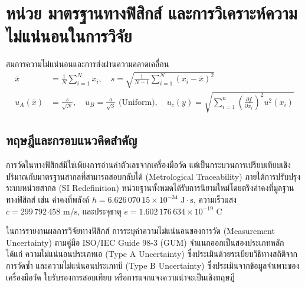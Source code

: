 
\chapter{หน่วย มาตรฐานทางฟิสิกส์ และการวิเคราะห์ความไม่แน่นอนในการวิจัย}
\label{ch:chapter01}


\vspace{0.4cm}

\begin{equationsbox}{สมการความไม่แน่นอนและการส่งผ่านความคลาดเคลื่อน}
\begin{align}
\bar{x} &= \frac{1}{N}\sum_{i=1}^{N} x_i, \quad s = \sqrt{\frac{1}{N-1}\sum_{i=1}^{N}(x_i - \bar{x})^2} \\
u_A(\bar{x}) &= \frac{s}{\sqrt{N}}, \quad u_B = \frac{a}{\sqrt{3}} \text{ (Uniform)}, \quad u_c(y) = \sqrt{\sum_{i=1}^{n}\left(\frac{\partial f}{\partial x_i}\right)^2 u^2(x_i)}
\end{align}
\end{equationsbox}

\section{ทฤษฎีและกรอบแนวคิดสำคัญ}

การวัดในทางฟิสิกส์มิใช่เพียงการอ่านค่าตัวเลขจากเครื่องมือวัด แต่เป็นกระบวนการเปรียบเทียบเชิงปริมาณกับมาตรฐานสากลที่สามารถสอบกลับได้ (Metrological Traceability) ภายใต้การปรับปรุงระบบหน่วยสากล (SI Redefinition) หน่วยฐานทั้งหมดได้รับการนิยามใหม่โดยตรึงค่าคงที่มูลฐานทางฟิสิกส์ เช่น ค่าคงที่พลังค์ $h = 6.626\,070\,15 \times 10^{-34}\text{ J}\cdot\text{s}$, ความเร็วแสง $c = 299\,792\,458\text{ m/s}$, และประจุธาตุ $e = 1.602\,176\,634 \times 10^{-19}\text{ C}$

ในการรายงานผลการวิจัยทางฟิสิกส์ การระบุค่าความไม่แน่นอนของการวัด (Measurement Uncertainty) ตามคู่มือ ISO/IEC Guide 98-3 (GUM) จำแนกออกเป็นสองประเภทหลัก ได้แก่ ความไม่แน่นอนประเภทเอ (Type A Uncertainty) ซึ่งประเมินด้วยระเบียบวิธีทางสถิติจากการวัดซ้ำ และความไม่แน่นอนประเภทบี (Type B Uncertainty) ซึ่งประเมินจากข้อมูลจำเพาะของเครื่องมือวัด ใบรับรองการสอบเทียบ หรือการแจกแจงความน่าจะเป็นเชิงทฤษฎี

